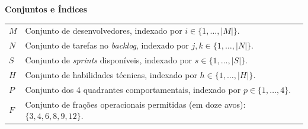 \documentclass[a4paper,11pt]{article}
\begin{document}
\vspace{0.3cm}
\noindent\textbf{Conjuntos e Índices}
\begin{center}
    \begin{tabular}{p{2.5cm} p{12cm}}
        $M$ & Conjunto de desenvolvedores, indexado por $i \in \{1, \dots, |M|\}$. \\
        $N$ & Conjunto de tarefas no \textit{backlog}, indexado por $j, k \in \{1, \dots, |N|\}$. \\
        $S$ & Conjunto de \textit{sprints} disponíveis, indexado por $s \in \{1, \dots, |S|\}$. \\
        $H$ & Conjunto de habilidades técnicas, indexado por $h \in \{1, \dots, |H|\}$. \\
        $P$ & Conjunto dos 4 quadrantes comportamentais, indexado por $p \in \{1, \dots, 4\}$. \\
        $F$ & Conjunto de frações operacionais permitidas (em doze avos): $\{3, 4, 6, 8, 9, 12\}$.
    \end{tabular}
\end{center}
\end{document}
